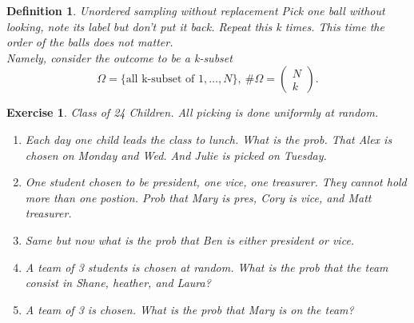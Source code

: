 \documentclass[a4paper]{article}
\newcounter{counter}
\numberwithin{counter}{subsection}
\theoremstyle{break}
\newtheorem{definition}{Definition}
\newtheorem{exe}[counter]{Exercise}
\begin{document}
\begin{definition}
	Unordered sampling without replacement Pick one ball without looking, note its label but don't put it back. Repeat this k times. This time the order of the balls does not matter.\\
	Namely, consider the outcome to be a k-subset \[
        \Omega = \{\text{all k-subset of 1}, \ldots, N\}, \: \#\Omega = \begin{pmatrix} N \\ k \end{pmatrix}
	.\] 

\end{definition}

\begin{exe}
	Class of 24 Children. All picking is done uniformly at random.
	\begin{enumerate}
		\item Each day one child leads the class to lunch. What is the prob. That Alex is chosen on Monday and Wed. And Julie is picked on Tuesday.
		\item One student chosen to be president, one vice, one treasurer. They cannot hold more than one postion. Prob that Mary is pres, Cory is vice, and Matt treasurer.
		\item Same but now what is the prob that Ben is either president or vice.
		\item A team of 3 students is chosen at random. What is the prob that the team consist in Shane, heather, and Laura?
		\item A team of 3 is chosen. What is the prob that Mary is on the team?
	\end{enumerate}


\end{exe}
\end{document}
